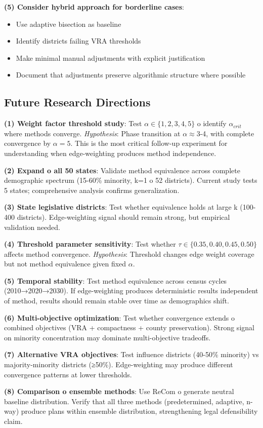 \textbf{(5) Consider hybrid approach for borderline cases}:
\begin{itemize}
\item Use adaptive bisection as baseline
\item Identify districts failing VRA thresholds
\item Make minimal manual adjustments with explicit justification
\item Document that adjustments preserve algorithmic structure where possible
\end{itemize}

\subsection{Future Research Directions}

\textbf{(1) Weight factor threshold study}: Test $\alpha \in \{1, 2, 3, 4, 5\}$ 	o identify $\alpha_{crit}$ where methods converge. \textit{Hypothesis}: Phase transition at $\alpha \approx 3$-4, with complete convergence by $\alpha = 5$. This is the most critical follow-up experiment for understanding when edge-weighting produces method independence.

\textbf{(2) Expand 	o all 50 states}: Validate method equivalence across complete demographic spectrum (15-60\% minority, k=1 	o 52 districts). Current study tests 5 states; comprehensive analysis confirms generalization.

\textbf{(3) State legislative districts}: Test whether equivalence holds at large k (100-400 districts). Edge-weighting signal should remain strong, but empirical validation needed.

\textbf{(4) Threshold parameter sensitivity}: Test whether $\tau \in \{0.35, 0.40, 0.45, 0.50\}$ affects method convergence. \textit{Hypothesis}: Threshold changes edge weight coverage but not method equivalence given fixed $\alpha$.

\textbf{(5) Temporal stability}: Test method equivalence across census cycles (2010→2020→2030). If edge-weighting produces deterministic results independent of method, results should remain stable over time as demographics shift.

\textbf{(6) Multi-objective optimization}: Test whether convergence extends 	o combined objectives (VRA + compactness + county preservation). Strong signal on minority concentration may dominate multi-objective tradeoffs.

\textbf{(7) Alternative VRA objectives}: Test influence districts (40-50\% minority) vs majority-minority districts (≥50\%). Edge-weighting may produce different convergence patterns at lower thresholds.

\textbf{(8) Comparison 	o ensemble methods}: Use ReCom 	o generate neutral baseline distribution. Verify that all three methods (predetermined, adaptive, n-way) produce plans within ensemble distribution, strengthening legal defensibility claim.
